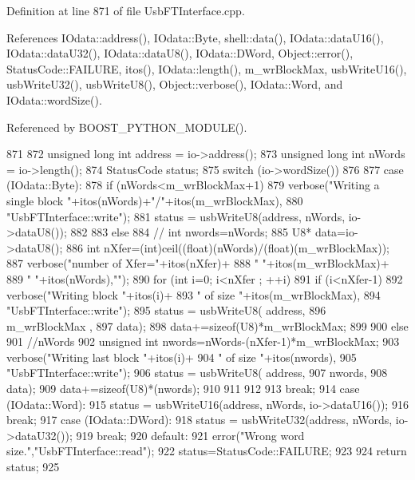 Definition at line 871 of file UsbFTInterface.cpp.

References IOdata::address(), IOdata::Byte, shell::data(), IOdata::dataU16(), IOdata::dataU32(), IOdata::dataU8(), IOdata::DWord, Object::error(), StatusCode::FAILURE, itos(), IOdata::length(), m\_\-wrBlockMax, usbWriteU16(), usbWriteU32(), usbWriteU8(), Object::verbose(), IOdata::Word, and IOdata::wordSize().

Referenced by BOOST\_\-PYTHON\_\-MODULE().


\begin{DoxyCode}
871                                           {
872   unsigned long int address = io->address();
873   unsigned long int nWords  = io->length();
874   StatusCode status;
875   switch (io->wordSize())
876   {
877   case (IOdata::Byte):
878     if (nWords<m_wrBlockMax+1){
879       verbose("Writing a single block "+itos(nWords)+"/"+itos(m_wrBlockMax),
880           "UsbFTInterface::write");
881       status = usbWriteU8(address, nWords, io->dataU8());
882     }
883     else {
884       //      int nwords=nWords;
885       U8* data=io->dataU8();
886       int nXfer=(int)ceil((float)(nWords)/(float)(m_wrBlockMax));
887       verbose("number of Xfer="+itos(nXfer)+
888           " "+itos(m_wrBlockMax)+
889           " "+itos(nWords),"");
890       for (int i=0; i<nXfer ; ++i){
891     if (i<nXfer-1){
892       verbose("Writing block "+itos(i)+
893           " of size "+itos(m_wrBlockMax),
894           "UsbFTInterface::write");
895       status = usbWriteU8( address, 
896                    m_wrBlockMax , 
897                    data);
898       data+=sizeof(U8)*m_wrBlockMax;
899     }
900     else {
901       //nWords%
902       unsigned int nwords=nWords-(nXfer-1)*m_wrBlockMax;
903       verbose("Writing last block "+itos(i)+
904           " of size "+itos(nwords),
905           "UsbFTInterface::write");
906       status = usbWriteU8( address, 
907                    nwords, 
908                    data); 
909       data+=sizeof(U8)*(nwords);
910     }
911       }
912     }
913     break;
914   case (IOdata::Word):
915     status = usbWriteU16(address, nWords, io->dataU16());
916     break;
917   case (IOdata::DWord):
918     status = usbWriteU32(address, nWords, io->dataU32());
919     break;
920   default:
921     error("Wrong word size.","UsbFTInterface::read");
922     status=StatusCode::FAILURE;
923   }
924   return status;
925 }
\end{DoxyCode}


